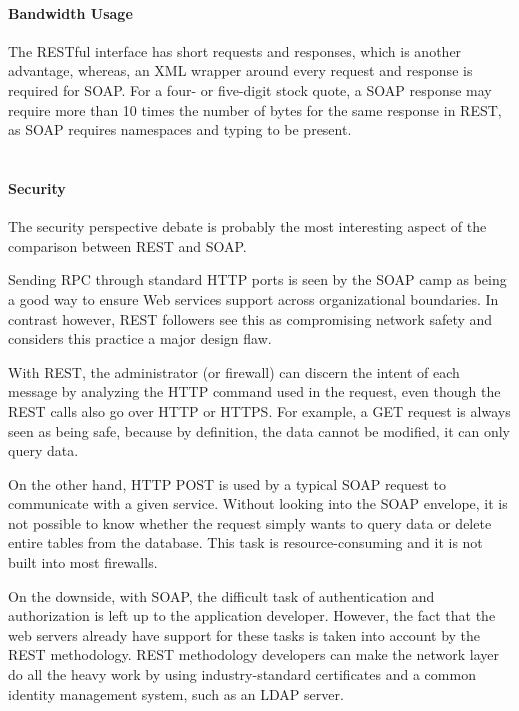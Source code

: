 \paragraph{Bandwidth Usage}

The RESTful interface has short requests and responses, which is another advantage, whereas, an \ac{XML} wrapper around every request and response is required for \ac{SOAP}. For a four- or five-digit stock quote, a \ac{SOAP} response may require more than 10 times the number of bytes for the same response in \ac{REST}, as \ac{SOAP} requires namespaces and typing to be present. 
\\
\\
\paragraph{Security}
The security perspective debate is probably the most interesting aspect of the comparison between \ac{REST} and \ac{SOAP}. 

Sending \ac{RPC} through standard \ac{HTTP} ports is seen by the \ac{SOAP} camp as being a good way to ensure Web services support across organizational boundaries. In contrast however, \ac{REST} followers see this as compromising network safety and considers this practice a major design flaw.

With \ac{REST}, the administrator (or firewall) can discern the intent of each message by analyzing the \ac{HTTP} command used in the request, even though the \ac{REST} calls also go over \ac{HTTP} or \ac{HTTPS}. For example, a GET request is always seen as being safe, because by definition, the data cannot be modified, it can only query data.

On the other hand, \ac{HTTP} POST is used by a typical \ac{SOAP} request to communicate with a given service. Without looking into the \ac{SOAP} envelope, it is not possible to know whether the request simply wants to query data or delete entire tables from the database. This task is resource-consuming and it is not built into most firewalls.

On the downside, with \ac{SOAP}, the difficult task of authentication and authorization is left up to the application developer. However, the fact that the web servers already have support for these tasks is taken into account by the \ac{REST} methodology. \ac{REST} methodology developers can make the network layer do all the heavy work by using industry-standard certificates and a common identity management system, such as an \ac{LDAP} server.

